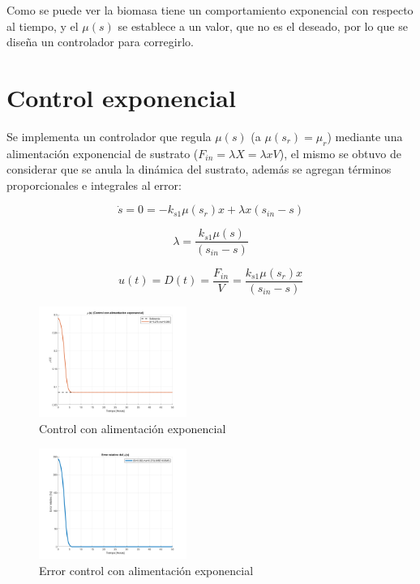 \documentclass[letterpaper, 10 pt, conference]{ieeeconf}  %
\begin{document}
Como se puede ver la biomasa tiene un comportamiento exponencial con respecto al tiempo, y el $\mu(s)$ se establece a un valor, que no es el deseado, por lo que se diseña un controlador para corregirlo.

\section{Control exponencial}
Se implementa un controlador que regula \(\mu(s)\) (a \(\mu(s_r)=\mu_r\)) mediante una alimentación exponencial de sustrato ($F_{in}=\lambda X=\lambda xV$), el mismo se obtuvo de considerar que se anula la dinámica del sustrato, además se agregan términos proporcionales e integrales al error:

\begin{equation*}
  \dot{s} = 0 = -k_{s1}\mu(s_r)x+\lambda x (s_{in}-s)
\end{equation*}

\begin{equation*}
  \lambda = \frac{k_{s1}\mu(s)}{(s_{in}-s)}
\end{equation*}

\begin{equation*}
  u(t) = D(t) = \frac{F_{in}}{V} = \frac{k_{s1}\mu(s_r)x}{(s_{in}-s)}
\end{equation*}

\begin{figure}[H]
  \centering
  \includegraphics[width=0.43\textwidth]{./Images_tp3/exp.png}
  \caption{Control con alimentación exponencial}
\end{figure}
\begin{figure}[H]
  \centering
  \includegraphics[width=0.43\textwidth]{./Images_tp3/exp_err.png}
  \caption{Error control con alimentación exponencial}
\end{figure}
\end{document}
